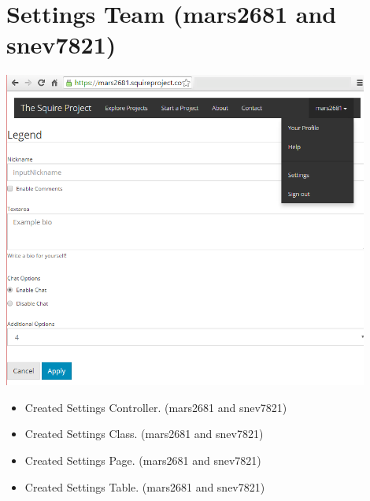 \documentclass[11pt]{report}
\begin{document}
\section{Settings Team (mars2681 and snev7821)}
    \includegraphics[width=0.9\textwidth]{images/settings}
    \begin{itemize}
        \item Created Settings Controller. (mars2681 and snev7821)
        \item Created Settings Class. (mars2681 and snev7821)
        \item Created Settings Page. (mars2681 and snev7821)
        \item Created Settings Table. (mars2681 and snev7821)
    \end{itemize}
\end{document}
